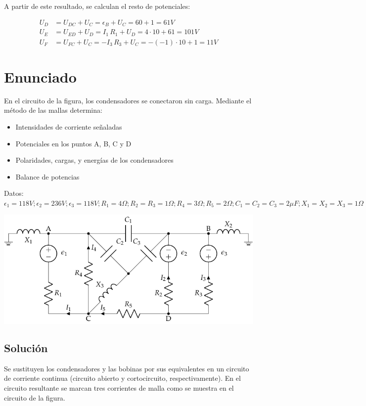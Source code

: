 A partir de este resultado, se calculan el resto de potenciales:

\begin{align*}
  U_D &= U_{DC} + U_C = \epsilon_B + U_C =60+1={{61} V}\\
  U_E &= U_{ED} + U_D = I_1 \, R_1 + U_D =4\cdot 10+61={{101} V}\\
  U_F &= U_{FC} + U_C = -I_3 \, R_3 + U_C =-(-1)\cdot 10+1={{11} V}
\end{align*}

\section{Enunciado}
En el circuito de la figura, los condensadores se conectaron sin
carga. Mediante el método de las mallas determina:
\begin{itemize}
\item Intensidades de corriente señaladas
\item Potenciales en los puntos A, B, C y D
\item Polaridades, cargas, y energías de los condensadores
\item Balance de potencias
\end{itemize}
Datos:
$ \epsilon_{1}={118}V; \epsilon_{2}={236} V; \epsilon_{3}=118V; R_{1}=
{4}\Omega; R_{2}=R_{3}={1}{\Omega}; R_{4}= {3}{\Omega};
R_{5}={2}{\Omega}; C_{1}=C_{2}=C_{3}={2}{\mu F}; X_1 = X_2 = X_3 =
{1}{\Omega}$

\begin{center}
  \includegraphics{figuras/mallas_condensadores.pdf}
\end{center}

\subsection*{Solución}
Se sustituyen los condensadores y las bobinas por sus equivalentes en
un circuito de corriente continua (circuito abierto y cortocircuito,
respectivamente). En el circuito resultante se marcan tres corrientes
de malla como se muestra en el circuito de la figura.

